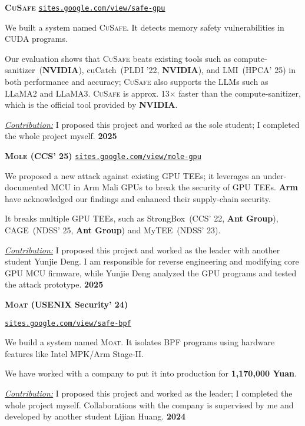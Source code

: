 \documentclass{resume}
\begin{document}
\begin{content}
  \textbf{\textsc{CuSafe}} \enspace
  {\href{https://sites.google.com/view/safe-gpu/}{\texttt{sites.google.com/view/safe-gpu}}}

  {We built a system named \textsc{CuSafe}. It detects memory safety vulnerabilities in CUDA programs.}

  {Our evaluation shows that \textsc{CuSafe} beats existing tools such as compute-sanitizer~(\textbf{NVIDIA}), cuCatch~(PLDI '22, \textbf{NVIDIA}), and LMI~(HPCA' 25) in both performance and accuracy; \textsc{CuSafe} also supports the LLMs such as LLaMA2 and LLaMA3. \textsc{CuSafe} is approx. 13$\times$ faster than the compute-sanitizer, which is the official tool provided by \textbf{NVIDIA}.}

  {\underline{\textit{Contribution:}} I proposed this project and worked as the sole student; I completed the whole project myself.}
  \hfill {\bf 2025}


  {\bf \textbf{\textsc{Mole}} (CCS' 25)} \enspace
  {\href{https://sites.google.com/view/mole-gpu}{\texttt{sites.google.com/view/mole-gpu}}}

  {We proposed a new attack against existing GPU TEEs; it leverages an under-documented MCU in Arm Mali GPUs to break the security of GPU TEEs. \textbf{Arm} have acknowledged our findings and enhanced their supply-chain security.}

  {It breaks multiple GPU TEEs, such as StrongBox~(CCS' 22, \textbf{Ant Group}), CAGE~(NDSS' 25, \textbf{Ant Group}) and MyTEE~(NDSS' 23).}

  {\underline{\textit{Contribution:}} I proposed this project and worked as the leader with another student Yunjie Deng. I am responsible for reverse engineering and modifying core GPU MCU firmware, while Yunjie Deng analyzed the GPU programs and tested the attack prototype.}
  \hfill{\bf 2025}


  {\bf \textbf{\textsc{Moat}} (USENIX Security' 24)} \enspace
  {\href{https://sites.google.com/view/safe-bpf/}{\texttt{sites.google.com/view/safe-bpf}}
    
    {We build a system named \textsc{Moat}. It isolates BPF programs using hardware features like Intel MPK/Arm Stage-II.}

    {We have worked with a company to put it into production for \textbf{1,170,000 Yuan}.}
    
    {\underline{\textit{Contribution:}} I proposed this project and worked as the leader; I completed the whole project myself. Collaborations with the company is supervised by me and developed by another student Lijian Huang.}
    \hfill {\bf 2024}

}
\end{content}
\end{document}
